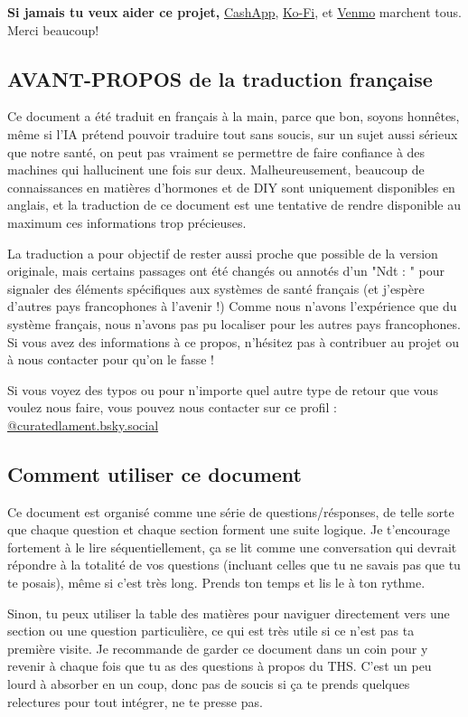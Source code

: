 \documentclass{article}
\begin{document}
\textbf{Si jamais tu veux aider ce projet,} \href{https://cash.app/Katitties}{CashApp}, \href{https://ko-fi.com/katitties}{Ko-Fi}, et \href{https://account.venmo.com/u/katitties}{Venmo} marchent tous. Merci beaucoup!

\subsection{AVANT-PROPOS de la traduction française}

Ce document a été traduit en français à la main, parce que bon, soyons honnêtes, même si l'IA prétend pouvoir traduire tout sans soucis, sur un sujet aussi sérieux que notre santé, on peut pas vraiment se permettre de faire confiance à des machines qui hallucinent une fois sur deux. 
Malheureusement, beaucoup de connaissances en matières d'hormones et de DIY sont uniquement disponibles en anglais, et la traduction de ce document est une tentative de rendre disponible au maximum ces informations trop précieuses.

La traduction a pour objectif de rester aussi proche que possible de la version originale, mais certains passages ont été changés ou annotés d'un "Ndt : " pour signaler des éléments spécifiques aux systèmes de santé français (et j'espère d'autres pays francophones à l'avenir !) 
Comme nous n'avons l'expérience que du système français, nous n'avons pas pu localiser pour les autres pays francophones. Si vous avez des informations à ce propos, n'hésitez pas à contribuer au projet ou à nous contacter pour qu'on le fasse !

Si vous voyez des typos ou pour n'importe quel autre type de retour que vous voulez nous faire, vous pouvez nous contacter sur ce profil : \href{https://bsky.app/profile/curatedlament.bsky.social}{@curatedlament.bsky.social}

\subsection*{Comment utiliser ce document}

Ce document est organisé comme une série de questions/résponses, de telle sorte que chaque question et chaque section forment une suite logique. Je t'encourage fortement à le lire séquentiellement, ça se lit comme une conversation qui devrait répondre à la totalité de vos questions (incluant celles que tu ne savais pas que tu te posais), même si c'est très long. Prends ton temps et lis le à ton rythme. 

Sinon, tu peux utiliser la table des matières pour naviguer directement vers une section ou une question particulière, ce qui est très utile si ce n'est pas ta première visite. Je recommande de garder ce document dans un coin pour y revenir à chaque fois que tu as des questions à propos du THS. C'est un peu lourd à absorber en un coup, donc pas de soucis si ça te prends quelques relectures pour tout intégrer, ne te presse pas. 
\end{document}
